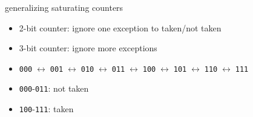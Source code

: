 \begin{frame}{generalizing saturating counters}
    \begin{itemize}
    \item 2-bit counter: ignore one exception to taken/not taken
    \vspace{.5cm}
    \item 3-bit counter: ignore more exceptions
    \item \texttt{000}$\;\leftrightarrow\;$\texttt{001}$\;\leftrightarrow\;$\texttt{010}$\;\leftrightarrow\;$\texttt{011}$\;\leftrightarrow\;$\texttt{100}$\;\leftrightarrow\;$\texttt{101}$\;\leftrightarrow\;$\texttt{110}$\;\leftrightarrow\;$\texttt{111}
    \item \texttt{000}-\texttt{011}: not taken
    \item \texttt{100}-\texttt{111}: taken
    \end{itemize}
\end{frame}
